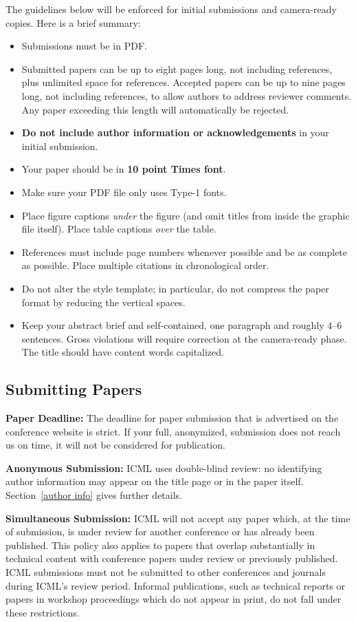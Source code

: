 \documentclass{article}
\begin{document}
The guidelines below will be enforced for initial submissions and
camera-ready copies. Here is a brief summary:
\begin{itemize}
\item Submissions must be in PDF\@.
\item Submitted papers can be up to eight pages long, not including references, plus unlimited space for references. Accepted papers can be up to nine pages long, not including references, to allow authors to address reviewer comments. Any paper exceeding this length will automatically be rejected. 
\item \textbf{Do not include author information or acknowledgements} in your
    initial submission.
\item Your paper should be in \textbf{10 point Times font}.
\item Make sure your PDF file only uses Type-1 fonts.
\item Place figure captions \emph{under} the figure (and omit titles from inside
    the graphic file itself). Place table captions \emph{over} the table.
\item References must include page numbers whenever possible and be as complete
    as possible. Place multiple citations in chronological order.
\item Do not alter the style template; in particular, do not compress the paper
    format by reducing the vertical spaces.
\item Keep your abstract brief and self-contained, one paragraph and roughly
    4--6 sentences. Gross violations will require correction at the
    camera-ready phase. The title should have content words capitalized.
\end{itemize}

\subsection{Submitting Papers}

\textbf{Paper Deadline:} The deadline for paper submission that is
advertised on the conference website is strict. If your full,
anonymized, submission does not reach us on time, it will not be
considered for publication. 

\textbf{Anonymous Submission:} ICML uses double-blind review: no identifying
author information may appear on the title page or in the paper
itself. Section~\ref{author info} gives further details.

\textbf{Simultaneous Submission:} ICML will not accept any paper which,
at the time of submission, is under review for another conference or
has already been published. This policy also applies to papers that
overlap substantially in technical content with conference papers
under review or previously published. ICML submissions must not be
submitted to other conferences and journals during ICML's review
period.
Informal publications, such as technical
reports or papers in workshop proceedings which do not appear in
print, do not fall under these restrictions.
\end{document}
